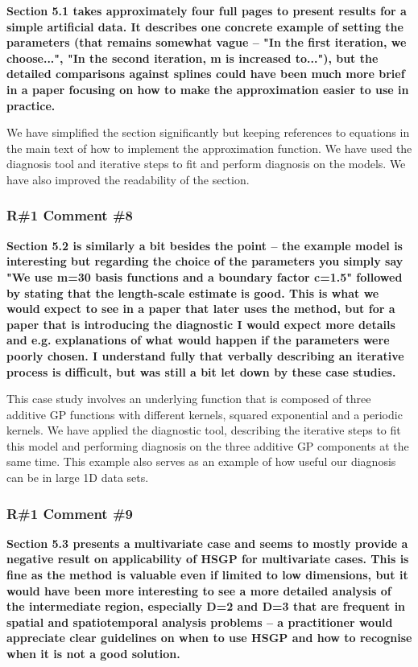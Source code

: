 \documentclass[11pt]{report}
\begin{document}
\textbf{Section 5.1 takes approximately four full pages to present results for a simple artificial data. It describes one concrete example of setting the parameters (that remains somewhat vague -- "In the first iteration, we choose...", "In the second iteration, m is increased to..."), but the detailed comparisons against splines could have been much more brief in a paper focusing on how to make the approximation easier to use in practice.}

We have simplified the section significantly but keeping references to equations in the main text of how to implement the approximation function. We have used the diagnosis tool and iterative steps to fit and perform diagnosis on the models. We have also improved the readability of the section.

\subsubsection*{R\#1 Comment \#8}

\textbf{Section 5.2 is similarly a bit besides the point -- the example model is interesting but regarding the choice of the parameters you simply say "We use m=30 basis functions and a boundary factor c=1.5" followed by stating that the length-scale estimate is good. This is what we would expect to see in a paper that later uses the method, but for a paper that is introducing the diagnostic I would expect more details and e.g. explanations of what would happen if the parameters were poorly chosen. I understand fully that verbally describing an iterative process is difficult, but was still a bit let down by these case studies.}

This case study involves an underlying function that is composed of three additive GP functions with different kernels, squared exponential and a periodic kernels. We have applied the diagnostic tool, describing the iterative steps to fit this model and performing diagnosis on the three additive GP components at the same time. This example also serves as an example of how useful our diagnosis can be in large 1D data sets.

\subsubsection*{R\#1 Comment \#9}

\textbf{Section 5.3 presents a multivariate case and seems to mostly provide a negative result on applicability of HSGP for multivariate cases. This is fine as the method is valuable even if limited to low dimensions, but it would have been more interesting to see a more detailed analysis of the intermediate region, especially D=2 and D=3 that are frequent in spatial and spatiotemporal analysis problems -- a practitioner would appreciate clear guidelines on when to use HSGP and how to recognise when it is not a good solution.}
\end{document}
